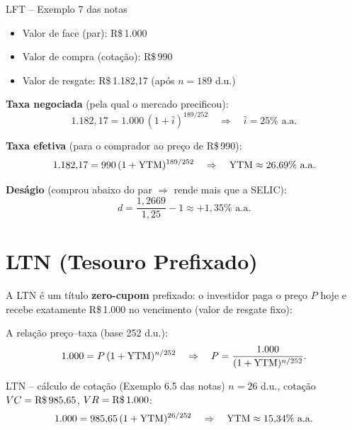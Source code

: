 \begin{exemplo}{LFT -- Exemplo 7 das notas}
\begin{itemize}[leftmargin=1.8em, nosep]
  \item Valor de face (par): R\$\,1.000
  \item Valor de compra (cotação): R\$\,990
  \item Valor de resgate: R\$\,1.182,17 (após $n = 189$ d.u.)
\end{itemize}

\medskip
\textbf{Taxa negociada} (pela qual o mercado precificou):
\[
  1{.}182{,}17 = 1{.}000\,(1+\bar{i})^{189/252}
  \quad\Rightarrow\quad \bar{i} = 25\% \text{ a.a.}
\]

\textbf{Taxa efetiva} (para o comprador ao preço de R\$\,990):
\[
  1{.}182{,}17 = 990\,(1+\mathrm{YTM})^{189/252}
  \quad\Rightarrow\quad \mathrm{YTM} \approx 26{,}69\% \text{ a.a.}
\]

\textbf{Deságio} (comprou abaixo do par $\Rightarrow$ rende mais que a SELIC):
\[
  d = \frac{1{,}2669}{1{,}25} - 1 \approx +1{,}35\% \text{ a.a.}
\]
\end{exemplo}

\section{LTN (Tesouro Prefixado)}

A LTN é um título \textbf{zero-cupom} prefixado: o investidor paga o preço $P$ hoje e recebe
exatamente R\$\,1.000 no vencimento (valor de resgate fixo):

\begin{center}
\end{center}

A relação preço--taxa (base 252 d.u.):
\[
  1{.}000 = P\,(1+\mathrm{YTM})^{n/252}
  \quad\Rightarrow\quad
  P = \frac{1{.}000}{(1+\mathrm{YTM})^{n/252}}.
\]

\begin{exemplo}{LTN -- cálculo de cotação (Exemplo 6.5 das notas)}
$n = 26$ d.u., cotação $VC = \text{R\$\,}985{,}65$, $VR = \text{R\$\,}1.000$:
\[
  1{.}000 = 985{,}65\,(1+\mathrm{YTM})^{26/252}
  \quad\Rightarrow\quad
  \mathrm{YTM} \approx 15{,}34\% \text{ a.a.}
\]
\end{exemplo}

